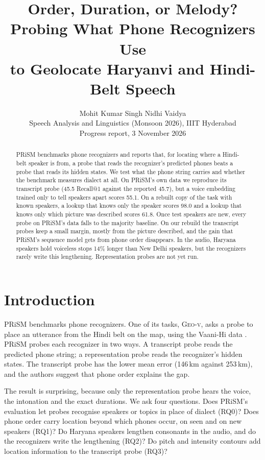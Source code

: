 \documentclass[11pt]{article}
\title{Order, Duration, or Melody? Probing What Phone Recognizers Use\\to Geolocate Haryanvi and Hindi-Belt Speech}
\author{Mohit Kumar Singh \qquad\qquad Nidhi Vaidya \\
  Speech Analysis and Linguistics (Monsoon 2026), IIIT Hyderabad \\
  Progress report, 3 November 2026}
\newcommand{\geov}{\textsc{Geo-v}}
\begin{document}
\maketitle

\begin{abstract}
PRiSM benchmarks phone recognizers and reports that, for locating where a Hindi-belt speaker is from, a probe
that reads the recognizer's predicted phones beats a probe that reads its hidden states. We test what the phone
string carries and whether the benchmark measures dialect at all. On PRiSM's own data we reproduce its transcript
probe (45.5 Recall@1 against the reported 45.7), but a voice embedding trained only to tell speakers apart
scores 55.1. On a
rebuilt copy of the task with known speakers, a lookup that knows only the speaker scores 98.0 and a lookup that
knows only which picture was described scores 61.8. Once test speakers are new, every probe on PRiSM's data falls
to the majority baseline. On our rebuild the transcript probes keep a small margin, mostly from the picture
described, and the gain that PRiSM's sequence model gets from phone order disappears. In the audio, Haryana
speakers hold voiceless stops 14\% longer than New Delhi speakers, but the recognizers rarely write this
lengthening. Representation probes are not yet run.
\end{abstract}

\section{Introduction}
PRiSM \citep{bharadwaj2026prism} benchmarks phone recognizers. One of its tasks, \geov{}, asks a probe to place
an utterance from the Hindi belt on the map, using the Vaani-Hi data \citep{ghosh2025vaani}. PRiSM probes each
recognizer in two ways. A transcript probe reads the predicted phone string; a representation probe reads the
recognizer's hidden states. The transcript probe has the lower mean error (146\,km against 253\,km), and the
authors suggest that phone order explains the gap.

The result is surprising, because only the representation probe hears the voice, the
intonation and the exact durations. We ask four questions. Does PRiSM's evaluation let probes recognise speakers or topics
in place of dialect (RQ0)? Does phone order carry location beyond which phones occur, on seen and on new speakers
(RQ1)? Do Haryana speakers lengthen consonants in the audio, and do the recognizers write the lengthening (RQ2)?
Do pitch and intensity contours add location information to the transcript probe (RQ3)?
\end{document}

